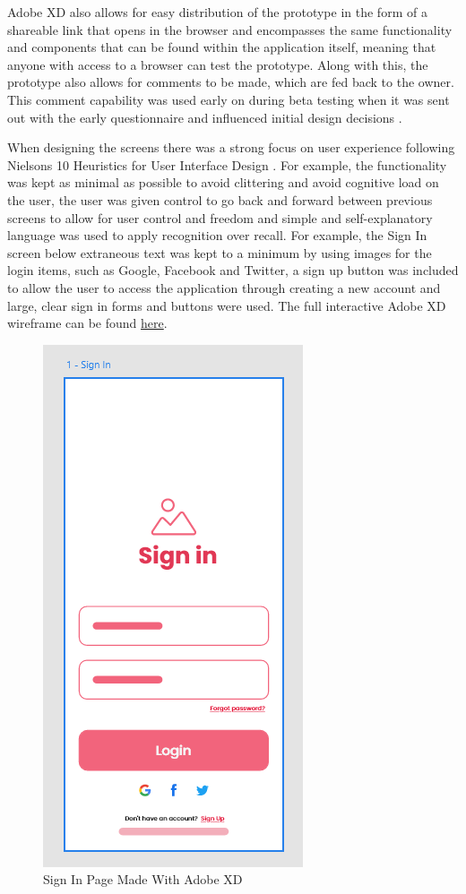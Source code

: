 \documentclass[12pt]{article}
\begin{document}
	
	Adobe XD also allows for easy distribution of the prototype in the form of a shareable link that opens in the browser and encompasses the same functionality and components that can be found within the application itself, meaning that anyone with access to a browser can test the prototype. Along with this, the prototype also allows for comments to be made, which are fed back to the owner. This comment capability was used early on during beta testing when it was sent out with the early questionnaire and influenced initial design decisions \cite{smashing-magazine}.
	
	When designing the screens there was a strong focus on user experience following Nielsons 10 Heuristics for User Interface Design \cite{nielson-normal-group-2020} . For example, the functionality was kept as minimal as possible to avoid clittering and avoid cognitive load on the user, the user was given control to go back and forward between previous screens to allow for user control and freedom and simple and self-explanatory language was used to apply recognition over recall. For example, the Sign In screen below extraneous text was kept to a minimum by using images for the login items, such as Google, Facebook and Twitter, a sign up button was included to allow the user to access the application through creating a new account and large, clear sign in forms and buttons were used. The full interactive Adobe XD wireframe can be found \href{https://xd.adobe.com/view/c6aeda9c-9b9a-456a-b699-cc4cd8b4cefa-93fd/}{here}. 
	
	\begin{figure}[H]
		\centering
		\includegraphics[scale=0.85]{images/sign-in.png}
		\caption{Sign In Page Made With Adobe XD}
		\label{fig:sign-in}
	\end{figure}
	
\end{document}
